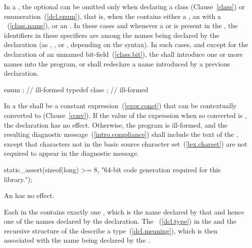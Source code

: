 \pnum
{}%
%
In a , the optional
 can be omitted only when declaring a
class (Clause~\ref{class}) or enumeration~(\ref{dcl.enum}), that is,
when the  contains either a
, an  with
a ~(\ref{class.name}), or an
. In these cases and whenever a
 or  is present in
the , the identifiers in these specifiers
are among the names being declared by the declaration (as
, , or
, depending on the syntax). In such cases, and
except for the declaration of an unnamed bit-field~(\ref{class.bit}),
the  shall introduce one or more names into
the program, or shall redeclare a name introduced by a previous
declaration.
\enterexample

\begin{codeblock}
enum { };           // ill-formed
typedef class { };  //  ill-formed
\end{codeblock}
\exitexample

\pnum
{}%
In a  the
 shall be a constant
expression~(\ref{expr.const}) that can be contextually converted to 
(Clause~\ref{conv}). If the value of the expression when
so converted is , the declaration has no
effect. Otherwise, the program is ill-formed, and the resulting
diagnostic message~(\ref{intro.compliance}) shall include the text of
the , except that characters not in the basic
source character set~(\ref{lex.charset}) are not required to appear in
the diagnostic message.
\enterexample

\begin{codeblock}
static_assert(sizeof(long) >= 8, "64-bit code generation required for this library.");
\end{codeblock}\exitexample

\pnum
An  has no effect.

\pnum
Each  in the 
contains exactly one , which is the name
declared by that  and hence one of the names
declared by the declaration. The
~(\ref{dcl.type}) in the
 and the recursive 
structure of the  describe a
type~(\ref{dcl.meaning}), which is then associated with the name being
declared by the .

